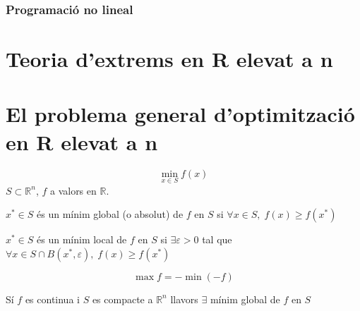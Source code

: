 \documentclass[../main.tex]{subfiles}
\begin{document}
\subsection{Programació no lineal}
\chapter{Teoria d'extrems en R elevat a n}
\chapter{El problema general d'optimització en R elevat a n}
\begin{displaymath}
\min_{x \in S} f(x)
\end{displaymath}
$S \subset \mathbb{R}^n$, $f$ a valors en $\mathbb{R}$.
\begin{definicio}
	$x^* \in S$ és un mínim global (o absolut) de $f$ en $S$ si $\forall x \in S,\;f(x)\geq f(x^*)$
\end{definicio}

\begin{definicio}
	$x^* \in S$ és un mínim local de $f$ en $S$ si $\exists \varepsilon > 0$ tal que $\forall x \in S \cap B(x^*, \varepsilon),\;f(x) \geq f(x^*)$
\end{definicio}

\begin{obs}
\begin{displaymath}
\max f = -\min(-f)
\end{displaymath}
\end{obs}
\begin{teorema}
	Sí $f$ es continua i $S$ es compacte a $\mathbb{R}^n$ llavors $\exists$ mínim global de $f$ en $S$
\end{teorema}
\end{document}
